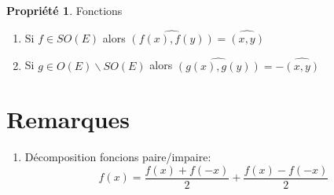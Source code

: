 \documentclass[fleqn]{article}
\theoremstyle{definition} \newtheorem*{defi}{D\'efinition}
\theoremstyle{definition} \newtheorem*{theo}{Th\'eor\`eme}
\theoremstyle{definition} \newtheorem*{coro}{Corollaire}
\theoremstyle{remark} \newtheorem*{rqs}{Remarques}
\theoremstyle{definition} \newtheorem*{prop}{Propri\'et\'e}
\begin{document}
\begin{prop} Fonctions
	\begin{enumerate}
		\item Si $f \in SO(E)$ alors $\hat{(f(x), f(y))} = \hat{(x,y)}$
		\item Si $g \in O(E) \backslash SO(E)$ alors $\hat{(g(x),g(y))} = -\hat{(x,y)}$
	\end{enumerate}
\end{prop}


\section{Remarques}
\begin{enumerate}
	\item D\'ecomposition foncions paire/impaire: \[f(x) = \frac{f(x) + f(-x)}{2} + \frac{f(x) - f(-x)}{2}\]
\end{enumerate}
\end{document}
